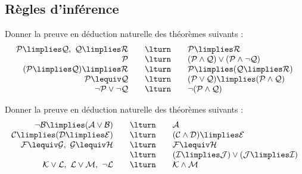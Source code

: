 \documentclass[11pt,class=report,crop=false]{standalone}
\begin{document}
\subsection*{Règles d'inférence}


\begin{exercicecours}
	Donner la preuve en déduction naturelle des théorèmes suivants :
	\[
	\begin{array}{rcl}
		\mathcal{P} \limplies \mathcal{Q} , \ 
		\mathcal{Q} \limplies \mathcal{R}
		&\quad \lturn \quad& 
		\mathcal{P} \limplies \mathcal{R} \\
		\mathcal{P}
		&\quad \lturn \quad& 
		(\mathcal{P} \land \mathcal{Q}) \lor (\mathcal{P} \land \lnot \mathcal{Q}) \\	
		(\mathcal{P} \limplies \mathcal{Q}) \limplies \mathcal{R}
		&\quad \lturn \quad& 
		\mathcal{P} \limplies (\mathcal{Q} \limplies \mathcal{R}) \\
		\mathcal{P} \lequiv \mathcal{Q}
		&\quad \lturn \quad& 
		(\mathcal{P} \lor \mathcal{Q}) \limplies (\mathcal{P} \land \mathcal{Q}) \\
		\lnot \mathcal{P} \lor \lnot \mathcal{Q}	
		&\quad \lturn \quad& 
		\lnot(\mathcal{P} \land \mathcal{Q})		
	\end{array}
	\]
	
\end{exercicecours}

\begin{exercicecours}
	Donner la preuve en déduction naturelle des théorèmes suivants :
	\[
	\begin{array}{rcl}
		\lnot\mathcal{B} \limplies (\mathcal{A} \lor \mathcal{B})
		&\quad \lturn \quad& 
		\mathcal{A} \\
		
		\mathcal{C} \limplies (\mathcal{D} \limplies \mathcal{E})
		&\quad \lturn \quad& 
		(\mathcal{C} \land \mathcal{D}) \limplies \mathcal{E} \\
		
		\mathcal{F} \lequiv  \mathcal{G}, \ 
		\mathcal{G} \lequiv  \mathcal{H}
		&\quad \lturn \quad& 
		\mathcal{F} \lequiv  \mathcal{H}
		\\
		
		&\quad \lturn \quad& 
		(\mathcal{I} \limplies \mathcal{J})
		\lor 
		(\mathcal{J} \limplies \mathcal{I}) \\
		
		\mathcal{K} \lor  \mathcal{L}, \
		\mathcal{L} \lor  \mathcal{M}, \
		\lnot \mathcal{L}	 
		&\quad \lturn \quad& 
		\mathcal{K} \land  \mathcal{M}
		\\			
		
	\end{array}
	\]	
\end{exercicecours}
\end{document}
